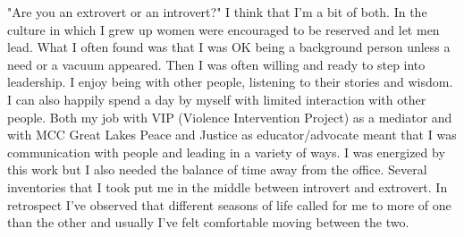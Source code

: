"Are you an extrovert or an introvert?"
I think that I'm a bit of both. In the culture in which I grew up women were encouraged to be reserved and let men lead. What I often found was that I was OK being a background person unless a need or a vacuum appeared. Then I was often willing and ready to step into leadership. I enjoy being with other people, listening to their stories and wisdom. I can also happily spend a day by myself with limited interaction with other people. Both my job with VIP (Violence Intervention Project) as a mediator and with MCC Great Lakes Peace and Justice as educator/advocate meant that I was communication with people and leading in a variety of ways. I was energized by this work but I also needed the balance of time away from the office. Several inventories that I took put me in the middle between introvert and extrovert. In retrospect I've observed that different seasons of life called for me to more of one than the other and usually I've felt comfortable moving between the two.




